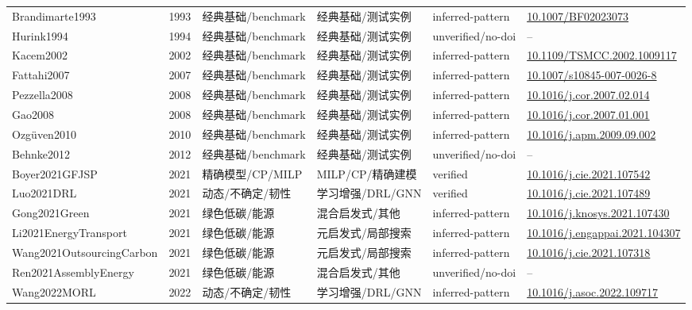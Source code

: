 \documentclass[UTF8,a4paper,11pt]{ctexart}
\begin{document}
\begin{landscape}
\begin{longtable}{>{\raggedright\arraybackslash}p{5.0cm}p{0.8cm}>{\raggedright\arraybackslash}p{2.6cm}>{\raggedright\arraybackslash}p{2.8cm}>{\raggedright\arraybackslash}p{2.6cm}>{\raggedright\arraybackslash}p{5.4cm}}
Brandimarte1993 & 1993 & 经典基础/benchmark & 经典基础/测试实例 & inferred-pattern & \href{https://doi.org/10.1007/BF02023073}{10.1007/BF02023073} \\
Hurink1994 & 1994 & 经典基础/benchmark & 经典基础/测试实例 & unverified/no-doi & -- \\
Kacem2002 & 2002 & 经典基础/benchmark & 经典基础/测试实例 & inferred-pattern & \href{https://doi.org/10.1109/TSMCC.2002.1009117}{10.1109/TSMCC.2002.1009117} \\
Fattahi2007 & 2007 & 经典基础/benchmark & 经典基础/测试实例 & inferred-pattern & \href{https://doi.org/10.1007/s10845-007-0026-8}{10.1007/s10845-007-0026-8} \\
Pezzella2008 & 2008 & 经典基础/benchmark & 经典基础/测试实例 & inferred-pattern & \href{https://doi.org/10.1016/j.cor.2007.02.014}{10.1016/j.cor.2007.02.014} \\
Gao2008 & 2008 & 经典基础/benchmark & 经典基础/测试实例 & inferred-pattern & \href{https://doi.org/10.1016/j.cor.2007.01.001}{10.1016/j.cor.2007.01.001} \\
Ozgüven2010 & 2010 & 经典基础/benchmark & 经典基础/测试实例 & inferred-pattern & \href{https://doi.org/10.1016/j.apm.2009.09.002}{10.1016/j.apm.2009.09.002} \\
Behnke2012 & 2012 & 经典基础/benchmark & 经典基础/测试实例 & unverified/no-doi & -- \\
Boyer2021GFJSP & 2021 & 精确模型/CP/MILP & MILP/CP/精确建模 & verified & \href{https://doi.org/10.1016/j.cie.2021.107542}{10.1016/j.cie.2021.107542} \\
Luo2021DRL & 2021 & 动态/不确定/韧性 & 学习增强/DRL/GNN & verified & \href{https://doi.org/10.1016/j.cie.2021.107489}{10.1016/j.cie.2021.107489} \\
Gong2021Green & 2021 & 绿色低碳/能源 & 混合启发式/其他 & inferred-pattern & \href{https://doi.org/10.1016/j.knosys.2021.107430}{10.1016/j.knosys.2021.107430} \\
Li2021EnergyTransport & 2021 & 绿色低碳/能源 & 元启发式/局部搜索 & inferred-pattern & \href{https://doi.org/10.1016/j.engappai.2021.104307}{10.1016/j.engappai.2021.104307} \\
Wang2021OutsourcingCarbon & 2021 & 绿色低碳/能源 & 元启发式/局部搜索 & inferred-pattern & \href{https://doi.org/10.1016/j.cie.2021.107318}{10.1016/j.cie.2021.107318} \\
Ren2021AssemblyEnergy & 2021 & 绿色低碳/能源 & 混合启发式/其他 & unverified/no-doi & -- \\
Wang2022MORL & 2022 & 动态/不确定/韧性 & 学习增强/DRL/GNN & inferred-pattern & \href{https://doi.org/10.1016/j.asoc.2022.109717}{10.1016/j.asoc.2022.109717} \\

\end{longtable}
\end{landscape}
\end{document}
